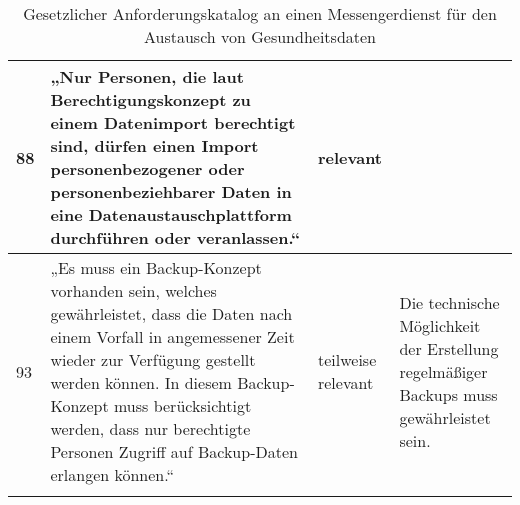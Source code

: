 \begin{longtable}{p{0.6cm}|p{6cm}|p{2cm}|p{6cm}}
    88     & „Nur Personen, die laut Berechtigungskonzept zu einem Datenimport berechtigt sind, dürfen einen Import personenbezogener oder personenbeziehbarer Daten in eine Datenaustauschplattform durchführen oder veranlassen.“                                                                               & relevant           &                                                                                                                                                                                                                                                                                                                                                                                                                                                                                                                                                                     \\ \hline
    93     & „Es muss ein Backup-Konzept vorhanden sein, welches gewährleistet, dass die Daten nach einem Vorfall in angemessener Zeit wieder zur Verfügung gestellt werden können. In diesem Backup-Konzept muss berücksichtigt werden, dass nur berechtigte Personen Zugriff auf Backup-Daten erlangen können.“ & teilweise relevant & Die technische Möglichkeit der Erstellung regelmäßiger Backups muss gewährleistet sein.                                                                                                                                                                                                                                                                                                                                                                                                                                                                             \\ \hline
\caption{Gesetzlicher Anforderungskatalog an einen Messengerdienst für den Austausch von Gesundheitsdaten}    
\end{longtable}


